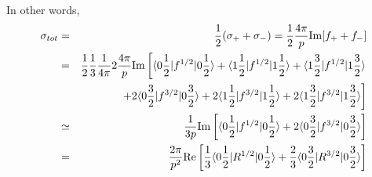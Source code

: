 \documentclass[10pt]{article}
\newcommand{\bea}{\begin{eqnarray}}
\newcommand{\eea}{\end{eqnarray}}
\newcommand{\no}{\nonumber \\}
\def\la{\langle}
\def\ra{\rangle}
\begin{document}
\begin{itemize}
In other words, 
\bea
\sigma_{tot}
&=&\frac{1}{2}(\sigma_{+}+\sigma_{-})
=\frac{1}{2}\frac{4\pi}{p}{\rm Im}[f_{+}+f_{-}]\no
&=&\frac{1}{2}\frac{1}{3}\frac{1}{4\pi}2
   \frac{4\pi}{p}{\rm Im}  
   \left[
   \la 0\frac{1}{2}|f^{1/2}|0\frac{1}{2}\ra
   +\la 1\frac{1}{2}|f^{1/2}|1\frac{1}{2}\ra
    +\la 1\frac{3}{2}|f^{1/2}|1\frac{3}{2}\ra
\right. \no 
& &\left.+2\la 0\frac{3}{2}|f^{3/2}|0\frac{3}{2}\ra
     +2\la 1\frac{1}{2}|f^{3/2}|1\frac{1}{2}\ra
     +2\la 1\frac{3}{2}|f^{3/2}|1\frac{3}{2}\ra   \right]\no
&\simeq&\frac{1}{3 p}{\rm Im}  
   \left[
   \la 0\frac{1}{2}|f^{1/2}|0\frac{1}{2}\ra
   +2\la 0\frac{3}{2}|f^{3/2}|0\frac{3}{2}\ra\right]\no
   &=&\frac{2\pi}{p^2}{\rm Re}  
   \left[
   \frac{1}{3}\la 0\frac{1}{2}|R^{1/2}|0\frac{1}{2}\ra
   +\frac{2}{3}\la 0\frac{3}{2}|R^{3/2}|0\frac{3}{2}\ra\right]
\eea


\end{itemize}
\end{document}
